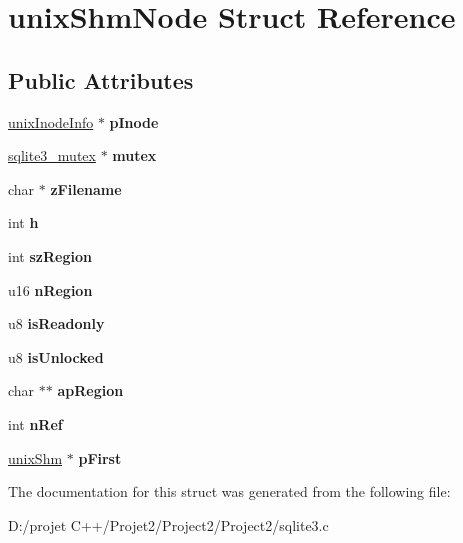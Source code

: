 \hypertarget{structunix_shm_node}{}\section{unix\+Shm\+Node Struct Reference}
\label{structunix_shm_node}
\subsection*{Public Attributes}
\begin{DoxyCompactItemize}
\item 
\mbox{\label{structunix_shm_node_ab6bc1cf84d65887a3395da6406843817}} 
\mbox{\hyperlink{structunix_inode_info}{unix\+Inode\+Info}} $\ast$ {\bfseries p\+Inode}
\item 
\mbox{\label{structunix_shm_node_aa90850530f48fec6f2a872874f8ddf1f}} 
\mbox{\hyperlink{structsqlite3__mutex}{sqlite3\+\_\+mutex}} $\ast$ {\bfseries mutex}
\item 
\mbox{\label{structunix_shm_node_a188c3bc5fcb4666ad0817ac093e7505d}} 
char $\ast$ {\bfseries z\+Filename}
\item 
\mbox{\label{structunix_shm_node_a9cd93c8052eb47f257e2d752e8f1fdba}} 
int {\bfseries h}
\item 
\mbox{\label{structunix_shm_node_ae8126f9db70a758c2f340ec06869e02b}} 
int {\bfseries sz\+Region}
\item 
\mbox{\label{structunix_shm_node_aaf1fceb640b3959424403885c0419a46}} 
u16 {\bfseries n\+Region}
\item 
\mbox{\label{structunix_shm_node_ad241b0a85f01110310cea91aa38fccb2}} 
u8 {\bfseries is\+Readonly}
\item 
\mbox{\label{structunix_shm_node_acb9958faa435f9df066cd874e6b70083}} 
u8 {\bfseries is\+Unlocked}
\item 
\mbox{\label{structunix_shm_node_a8eff550f9b10a2de463e9874f84efc5e}} 
char $\ast$$\ast$ {\bfseries ap\+Region}
\item 
\mbox{\label{structunix_shm_node_a6d9f0c9dec3f6710cb09c90723a8284b}} 
int {\bfseries n\+Ref}
\item 
\mbox{\label{structunix_shm_node_a0ddd6c4625acf5994a60b0c368bc665e}} 
\mbox{\hyperlink{structunix_shm}{unix\+Shm}} $\ast$ {\bfseries p\+First}
\end{DoxyCompactItemize}


The documentation for this struct was generated from the following file\+:\begin{DoxyCompactItemize}
\item 
D\+:/projet C++/\+Projet2/\+Project2/\+Project2/sqlite3.\+c\end{DoxyCompactItemize}
